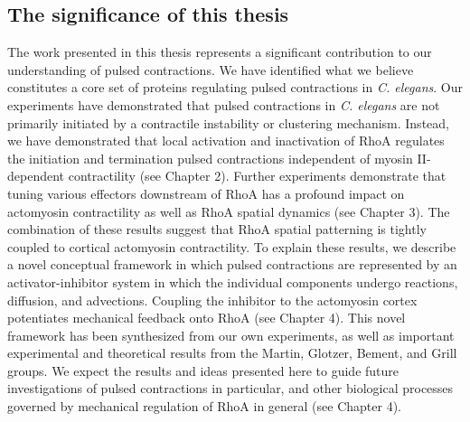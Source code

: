 \documentclass{ucetd}
\begin{document}
\subsection{The significance of this thesis} 
The work presented in this thesis represents a significant contribution to our understanding of pulsed contractions.  We have identified what we believe constitutes a core set of proteins regulating pulsed contractions in \textit{C. elegans}.  Our experiments have demonstrated that pulsed contractions in \textit{C. elegans} are not primarily initiated by a contractile instability or clustering mechanism.  Instead, we have demonstrated that local activation and inactivation of RhoA regulates the initiation and termination pulsed contractions independent of myosin II-dependent contractility (see Chapter 2).  Further experiments demonstrate that tuning various effectors downstream of RhoA has a profound impact on actomyosin contractility as well as RhoA spatial dynamics (see Chapter 3).  The combination of these results suggest that RhoA spatial patterning is tightly coupled to cortical actomyosin contractility.  To explain these results, we describe a novel conceptual framework in which pulsed contractions are represented by an activator-inhibitor system in which the individual components undergo reactions, diffusion, and advections.  Coupling the inhibitor to the actomyosin cortex potentiates mechanical feedback onto RhoA  (see Chapter 4).  This novel framework has been synthesized from our own experiments, as well as important experimental and theoretical results from the Martin, Glotzer, Bement, and Grill groups.  We expect the results and ideas presented here to guide future investigations of pulsed contractions in particular, and other biological processes governed by mechanical regulation of RhoA in general (see Chapter 4).
\end{document}
